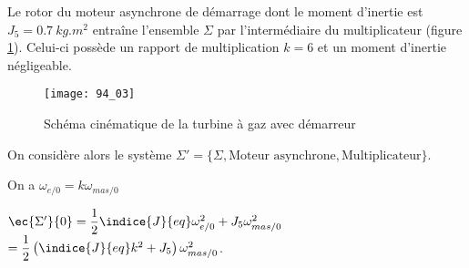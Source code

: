 \ifprof
\else
Le rotor du moteur asynchrone de démarrage dont le moment d’inertie est $J_5=\SI{0,7}{kg.m^2}$ entraîne
 l’ensemble $\Sigma$ par l’intermédiaire du multiplicateur (figure \ref{fig_94_03}). Celui-ci possède un rapport de multiplication $k=6$ et un moment d’inertie négligeable.
 
 \begin{figure}[!h]
\texttt{[image: 94\_03]}
\caption{Schéma cinématique de la turbine à gaz avec démarreur \label{fig_94_03}}
\end{figure}

On considère alors le système $\Sigma' = \{ \Sigma, \text{Moteur asynchrone}, \text{Multiplicateur}\}$.
 \fi
 
\ifprof 
\begin{corrige}
On a $\omega_{e/0} = k \omega_{mas/0}$

$\ec{\Sigma'}{0} = \dfrac{1}{2}\indice{J}{eq} \omega_{e/0}^2 + J_5 \omega_{mas/0}^2$
$=\dfrac{1}{2}\left(\indice{J}{eq} k^2 + J_5\right) \omega_{mas/0}^2$.
\end{corrige}
\else
\fi

 

\ifprof
\else


\fi